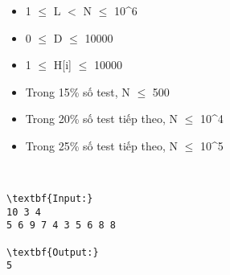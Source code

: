 \begin{itemize}
	\item 1  $\le$  L $<$ N  $\le$  10^6
	\item 0  $\le$  D  $\le$  10000
	\item 1  $\le$  H[i]  $\le$  10000
	\item Trong 15\% số test, N  $\le$  500
	\item Trong 20\% số test tiếp theo, N  $\le$  10^4
	\item Trong 25\% số test tiếp theo, N  $\le$  10^5
\end{itemize}

 
\begin{verbatim}
\textbf{Input:}
10 3 4
5 6 9 7 4 3 5 6 8 8

\textbf{Output:}
5\end{verbatim}